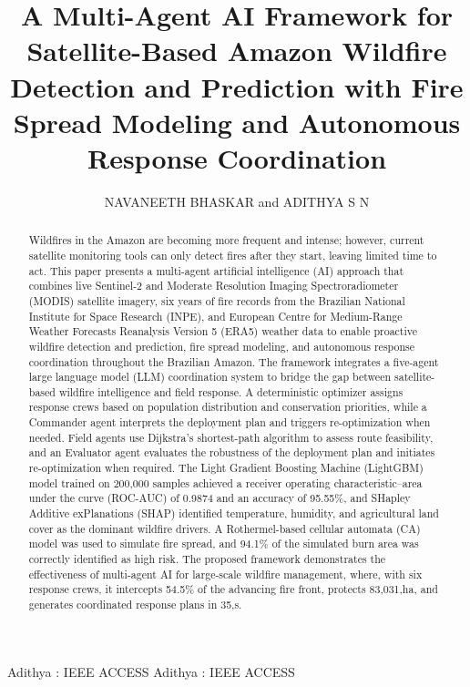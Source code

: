 \documentclass{ieeeaccess}
\begin{document}

\title{A Multi-Agent AI Framework for Satellite-Based Amazon Wildfire Detection and Prediction with Fire Spread Modeling and Autonomous Response Coordination}

\author{\uppercase{Navaneeth Bhaskar} and \uppercase{Adithya S N}}

\address[1]{Nitte (Deemed to be University), NMAM Institute of Technology (NMAMIT), Nitte, Karnataka, India (e-mail: navbskr@gmail.com, adithyasn2487@gmail.com)}



\markboth
{Adithya \headeretal: IEEE ACCESS}
{Adithya \headeretal: IEEE ACCESS}



\begin{abstract}
Wildfires in the Amazon are becoming more frequent and intense; however, current satellite monitoring tools can only detect fires after they start, leaving limited time to act. This paper presents a multi-agent artificial intelligence (AI) approach that combines live Sentinel-2 and Moderate Resolution Imaging Spectroradiometer (MODIS) satellite imagery, six years of fire records from the Brazilian National Institute for Space Research (INPE), and European Centre for Medium-Range Weather Forecasts Reanalysis Version 5 (ERA5) weather data to enable proactive wildfire detection and prediction, fire spread modeling, and autonomous response coordination throughout the Brazilian Amazon. The framework integrates a five-agent large language model (LLM) coordination system to bridge the gap between satellite-based wildfire intelligence and field response. A deterministic optimizer assigns response crews based on population distribution and conservation priorities, while a Commander agent interprets the deployment plan and triggers re-optimization when needed. Field agents use Dijkstra's shortest-path algorithm to assess route feasibility, and an Evaluator agent evaluates the robustness of the deployment plan and initiates re-optimization when required. The Light Gradient Boosting Machine (LightGBM) model trained on 200,000 samples achieved a receiver operating characteristic–area under the curve (ROC-AUC) of 0.9874 and an accuracy of 95.55\%, and SHapley Additive exPlanations (SHAP) identified temperature, humidity, and agricultural land cover as the dominant wildfire drivers. A Rothermel-based cellular automata (CA) model was used to simulate fire spread, and 94.1\% of the simulated burn area was correctly identified as high risk. The proposed framework demonstrates the effectiveness of multi-agent AI for large-scale wildfire management, where, with six response crews, it intercepts 54.5\% of the advancing fire front, protects 83,031,ha, and generates coordinated response plans in 35,s.
\end{abstract}
\end{document}
